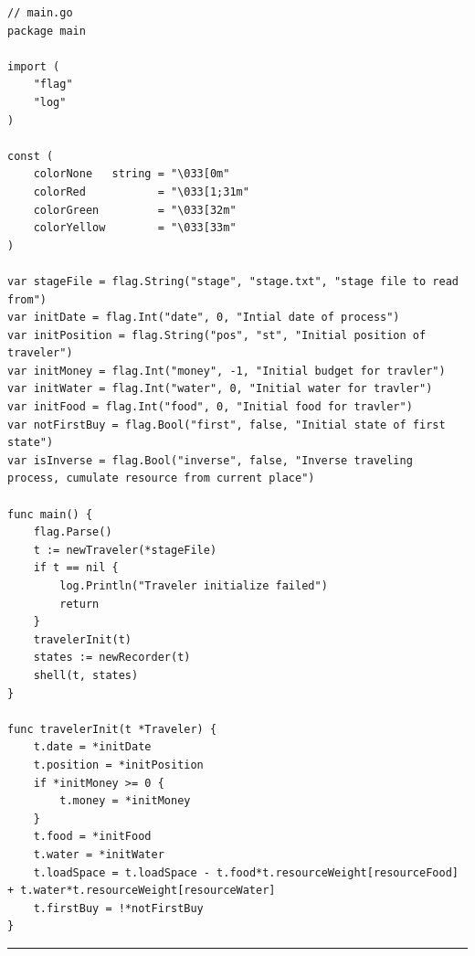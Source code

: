 \documentclass[a4paper]{ctexart}
\begin{document}
\begin{verbatim}
// main.go
package main

import (
    "flag"
    "log"
)

const (
    colorNone   string = "\033[0m"
    colorRed           = "\033[1;31m"
    colorGreen         = "\033[32m"
    colorYellow        = "\033[33m"
)

var stageFile = flag.String("stage", "stage.txt", "stage file to read from")
var initDate = flag.Int("date", 0, "Intial date of process")
var initPosition = flag.String("pos", "st", "Initial position of traveler")
var initMoney = flag.Int("money", -1, "Initial budget for travler")
var initWater = flag.Int("water", 0, "Initial water for travler")
var initFood = flag.Int("food", 0, "Initial food for travler")
var notFirstBuy = flag.Bool("first", false, "Initial state of first state")
var isInverse = flag.Bool("inverse", false, "Inverse traveling process, cumulate resource from current place")

func main() {
    flag.Parse()
    t := newTraveler(*stageFile)
    if t == nil {
        log.Println("Traveler initialize failed")
        return
    }
    travelerInit(t)
    states := newRecorder(t)
    shell(t, states)
}

func travelerInit(t *Traveler) {
    t.date = *initDate
    t.position = *initPosition
    if *initMoney >= 0 {
        t.money = *initMoney
    }
    t.food = *initFood
    t.water = *initWater
    t.loadSpace = t.loadSpace - t.food*t.resourceWeight[resourceFood] + t.water*t.resourceWeight[resourceWater]
    t.firstBuy = !*notFirstBuy
}
\end{verbatim}

\hrule
\end{document}
